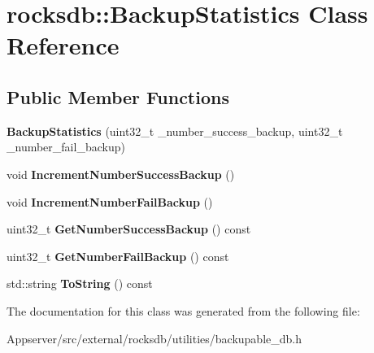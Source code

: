 \hypertarget{classrocksdb_1_1BackupStatistics}{}\section{rocksdb\+:\+:Backup\+Statistics Class Reference}
\label{classrocksdb_1_1BackupStatistics}
\subsection*{Public Member Functions}
\begin{DoxyCompactItemize}
\item 
{\bfseries Backup\+Statistics} (uint32\+\_\+t \+\_\+number\+\_\+success\+\_\+backup, uint32\+\_\+t \+\_\+number\+\_\+fail\+\_\+backup)\hypertarget{classrocksdb_1_1BackupStatistics_a7256228a765692e8ff75532b89c7b4a8}{}\label{classrocksdb_1_1BackupStatistics_a7256228a765692e8ff75532b89c7b4a8}

\item 
void {\bfseries Increment\+Number\+Success\+Backup} ()\hypertarget{classrocksdb_1_1BackupStatistics_a25cda07716dfe578672b4049adf7b7ea}{}\label{classrocksdb_1_1BackupStatistics_a25cda07716dfe578672b4049adf7b7ea}

\item 
void {\bfseries Increment\+Number\+Fail\+Backup} ()\hypertarget{classrocksdb_1_1BackupStatistics_ac0e5925e2bf1ee5e8b1b16555baba68b}{}\label{classrocksdb_1_1BackupStatistics_ac0e5925e2bf1ee5e8b1b16555baba68b}

\item 
uint32\+\_\+t {\bfseries Get\+Number\+Success\+Backup} () const\hypertarget{classrocksdb_1_1BackupStatistics_afe0f2000deb568c812c5c525ef9e942e}{}\label{classrocksdb_1_1BackupStatistics_afe0f2000deb568c812c5c525ef9e942e}

\item 
uint32\+\_\+t {\bfseries Get\+Number\+Fail\+Backup} () const\hypertarget{classrocksdb_1_1BackupStatistics_a74d26f5134cef2faa21e5e443d30c4c3}{}\label{classrocksdb_1_1BackupStatistics_a74d26f5134cef2faa21e5e443d30c4c3}

\item 
std\+::string {\bfseries To\+String} () const\hypertarget{classrocksdb_1_1BackupStatistics_a6a4e0c9f799367c506cc44ed0e4a1371}{}\label{classrocksdb_1_1BackupStatistics_a6a4e0c9f799367c506cc44ed0e4a1371}

\end{DoxyCompactItemize}


The documentation for this class was generated from the following file\+:\begin{DoxyCompactItemize}
\item 
Appserver/src/external/rocksdb/utilities/backupable\+\_\+db.\+h\end{DoxyCompactItemize}
